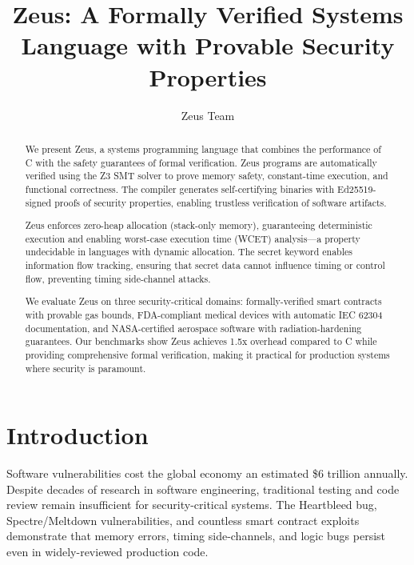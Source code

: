 \documentclass[sigplan,screen]{acmart}
\begin{document}
\title{Zeus: A Formally Verified Systems Language with Provable Security Properties}

\author{Zeus Team}

\begin{abstract}
We present Zeus, a systems programming language that combines the performance of C with the safety guarantees of formal verification. Zeus programs are automatically verified using the Z3 SMT solver to prove memory safety, constant-time execution, and functional correctness. The compiler generates self-certifying binaries with Ed25519-signed proofs of security properties, enabling trustless verification of software artifacts.

Zeus enforces zero-heap allocation (stack-only memory), guaranteeing deterministic execution and enabling worst-case execution time (WCET) analysis---a property undecidable in languages with dynamic allocation. The secret keyword enables information flow tracking, ensuring that secret data cannot influence timing or control flow, preventing timing side-channel attacks.

We evaluate Zeus on three security-critical domains: formally-verified smart contracts with provable gas bounds, FDA-compliant medical devices with automatic IEC 62304 documentation, and NASA-certified aerospace software with radiation-hardening guarantees. Our benchmarks show Zeus achieves 1.5x overhead compared to C while providing comprehensive formal verification, making it practical for production systems where security is paramount.
\end{abstract}

\maketitle

\section{Introduction}

Software vulnerabilities cost the global economy an estimated \$6 trillion annually. Despite decades of research in software engineering, traditional testing and code review remain insufficient for security-critical systems. The Heartbleed bug, Spectre/Meltdown vulnerabilities, and countless smart contract exploits demonstrate that memory errors, timing side-channels, and logic bugs persist even in widely-reviewed production code.
\end{document}
